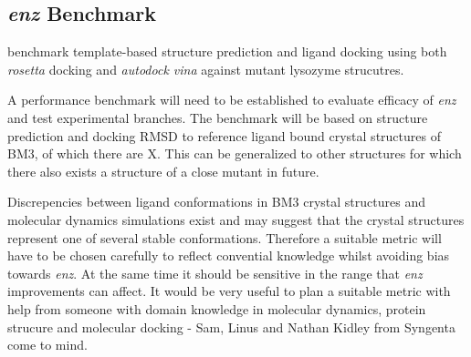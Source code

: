 \documentclass{article}
\begin{document}
\subsection{\textit{enz} Benchmark}
\textcite{rosettadock} benchmark template-based structure prediction and ligand docking using both \textit{rosetta} docking and \textit{autodock vina} against mutant lysozyme strucutres. %
\par
A performance benchmark will need to be established to evaluate efficacy of \textit{enz} and test experimental branches. The benchmark will be based on structure prediction and docking RMSD to reference ligand bound crystal structures of BM3, of which there are X. This can be generalized to other structures for which there also exists a structure of a close mutant in future. %
\par
Discrepencies between ligand conformations in BM3 crystal structures and molecular dynamics simulations exist and may suggest that the crystal structures represent one of several stable conformations. %
Therefore a suitable metric will have to be chosen carefully to reflect convential knowledge whilst avoiding bias towards \textit{enz}. At the same time it should be sensitive in the range that \textit{enz} improvements can affect. It would be very useful to plan a suitable metric with help from someone with domain knowledge in molecular dynamics, protein strucure and molecular docking - Sam, Linus and Nathan Kidley from Syngenta come to mind. %
\end{document}
